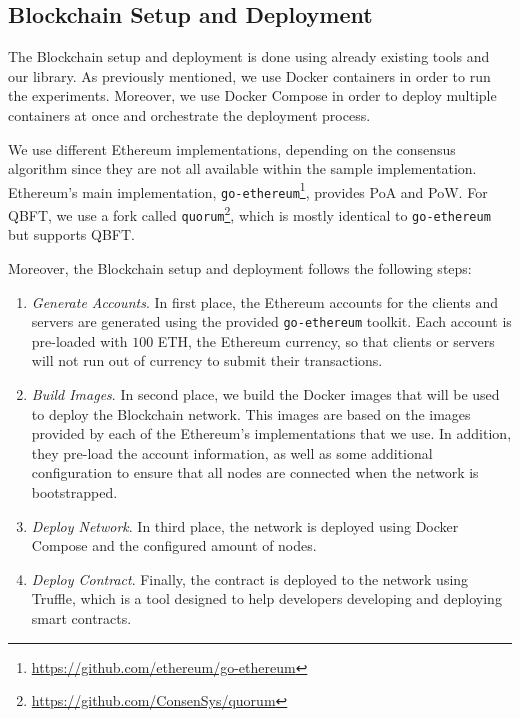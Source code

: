 \subsection{Blockchain Setup and Deployment}

The Blockchain setup and deployment is done using already existing tools and our library. As previously mentioned, we use Docker containers in order to run the experiments. Moreover, we use Docker Compose in order to deploy multiple containers at once and orchestrate the deployment process.

We use different Ethereum implementations, depending on the consensus algorithm since they are not all available within the sample implementation. Ethereum's main implementation, \texttt{go-ethereum}\footnote{\url{https://github.com/ethereum/go-ethereum}}, provides PoA and PoW. For QBFT, we use a fork called \texttt{quorum}\footnote{\url{https://github.com/ConsenSys/quorum}}, which is mostly identical to \texttt{go-ethereum} but supports QBFT.

Moreover, the Blockchain setup and deployment follows the following steps:

\begin{enumerate}
    \item \textit{Generate Accounts}. In first place, the Ethereum accounts for the clients and servers are generated using the provided \texttt{go-ethereum} toolkit. Each account is pre-loaded with $100$ ETH, the Ethereum currency, so that clients or servers will not run out of currency to submit their transactions.
    
    \item \textit{Build Images}. In second place, we build the Docker images that will be used to deploy the Blockchain network. This images are based on the images provided by each of the Ethereum's implementations that we use. In addition, they pre-load the account information, as well as some additional configuration to ensure that all nodes are connected when the network is bootstrapped.
    
    \item \textit{Deploy Network}. In third place, the network is deployed using Docker Compose and the configured amount of nodes.
    
    \item \textit{Deploy Contract}. Finally, the contract is deployed to the network using Truffle, which is a tool designed to help developers developing and deploying smart contracts.
\end{enumerate}


